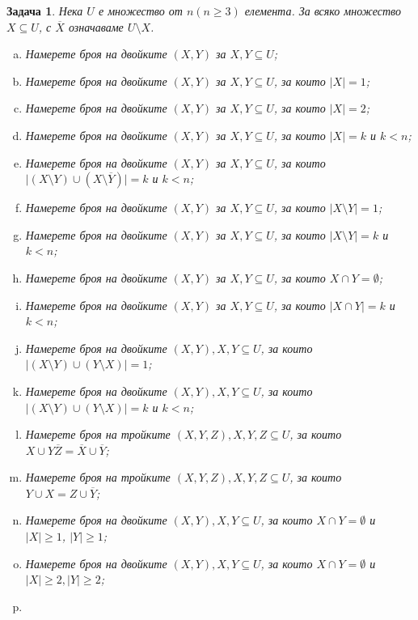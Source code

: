 \documentclass[a4paper]{article}
\newtheorem{problem}{Задача}
\begin{document}
\begin{problem} %
  Нека $U$ е множество от $n (n\geq 3)$ елемента. За всяко множество $X\subseteq U$, с $\overline{X}$ означаваме $U\setminus X$.
  \begin{enumerate}[a)]
  \item
    Намерете броя на двойките $(X,Y)$ за $X,Y\subseteq U$;
  \item
    Намерете броя на двойките $(X,Y)$ за $X,Y\subseteq U$, за които $\vert{X}\vert = 1$;
  \item
    Намерете броя на двойките $(X,Y)$ за $X,Y\subseteq U$, за които $\vert{X}\vert = 2$;
  \item
    Намерете броя на двойките $(X,Y)$ за $X,Y\subseteq U$, за които $\vert{X}\vert = k$ и $k < n$;
  \item
    Намерете броя на двойките $(X,Y)$ за $X,Y\subseteq U$, за които $\vert{(X\setminus{Y})\cup (X\setminus\overline{Y})}\vert = k$ и $k < n$;
  \item
    Намерете броя на двойките $(X,Y)$ за $X,Y\subseteq U$, за които $\vert{X\setminus Y}\vert = 1$;
  \item
    Намерете броя на двойките $(X,Y)$ за $X,Y\subseteq U$, за които $\vert{X\setminus Y}\vert = k$ и $k < n$;
  \item
    Намерете броя на двойките $(X,Y)$ за $X,Y\subseteq U$, за които $X\cap Y = \emptyset$;
  \item
    Намерете броя на двойките $(X,Y)$ за $X,Y\subseteq U$, за които $\vert{X\cap Y}\vert = k$ и $k < n$;
  \item
    Намерете броя на двойките $(X,Y), X,Y\subseteq U$, за които $|(X\setminus Y)\cup(Y\setminus X)| = 1$;
  \item
    Намерете броя на двойките $(X,Y), X,Y\subseteq U$, за които $|(X\setminus Y)\cup(Y\setminus X)| = k$ и $k < n$;
  \item
    Намерете броя на тройките $(X,Y,Z), X,Y,Z\subseteq U$, за които $X\cup Y\overline{Z} = \overline{X}\cup\overline{Y}$;
  \item
    Намерете броя на тройките $(X,Y,Z), X,Y,Z\subseteq U$, за които $Y\cup X = Z\cup\overline{Y}$;
  \item
    Намерете броя на двойките $(X,Y), X,Y\subseteq U$, за които $X\cap Y = \emptyset$ и
    $|X|\geq 1$, $|Y|\geq 1$;
  \item
    Намерете броя на двойките $(X,Y), X,Y\subseteq U$, за които $X\cap Y = \emptyset$ и 
    $|X|\geq 2, |Y|\geq 2$;
  \item

\end{enumerate}
\end{problem}
\end{document}
